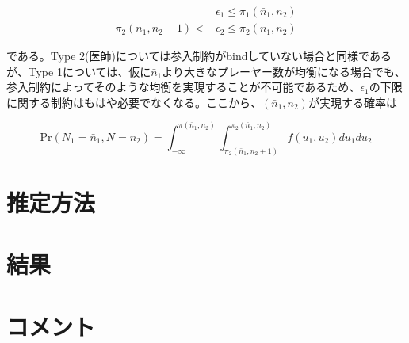 \documentclass[11pt]{jsarticle}
\begin{document}
\begin{itemize}
\begin{align*}
  & \epsilon_1 \leq \pi_1(\bar{n}_1, n_2) \\
  \pi_2(\bar{n}_1, n_2 + 1) < & \epsilon_2 \leq \pi_2 (n_1, n_2)
\end{align*}

である。Type 2(医師)については参入制約がbindしていない場合と同様であるが、Type 1については、仮に$\bar{n}_1$より大きなプレーヤー数が均衡になる場合でも、参入制約によってそのような均衡を実現することが不可能であるため、$\epsilon_1$の下限に関する制約はもはや必要でなくなる。ここから、$(\bar{n}_1, n_2)$が実現する確率は

\[
\text{Pr}(N_1 = \bar{n}_1, N = n_2) = \int_{- \infty}^{\pi(\bar{n}_1, n_2)} \int_{\pi_2(\bar{n}_1, n_2 + 1)}^{\pi_2(\bar{n}_1, n_2)} f(u_1, u_2) du_1 du_2
\]

\end{itemize}

\section{推定方法}



\section{結果}

\section{コメント}
\end{document}
